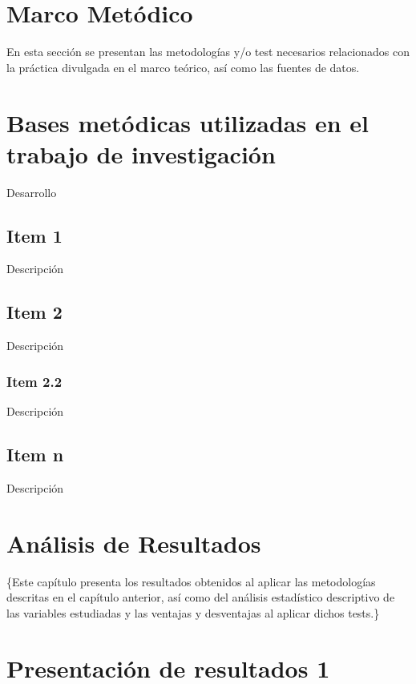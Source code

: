 \documentclass[
]{article}
\begin{document}
\section{Marco Metódico}

En esta sección se presentan las metodologías y/o test necesarios
relacionados con la práctica divulgada en el marco teórico, así como las
fuentes de datos.

\section{Bases metódicas utilizadas en el trabajo de investigación}

Desarrollo\\

\subsection{Item 1}

Descripción\\

\subsection{Item 2}

Descripción\\

\subsubsection{Item 2.2}

Descripción\\

\subsection{Item n}

Descripción\\

\section{Análisis de Resultados}

\{\small Este capítulo presenta los resultados obtenidos al aplicar las
metodologías descritas en el capítulo anterior, así como del análisis
estadístico descriptivo de las variables estudiadas y las ventajas y
desventajas al aplicar dichos tests.\}

\section{Presentación de resultados 1}
\end{document}
